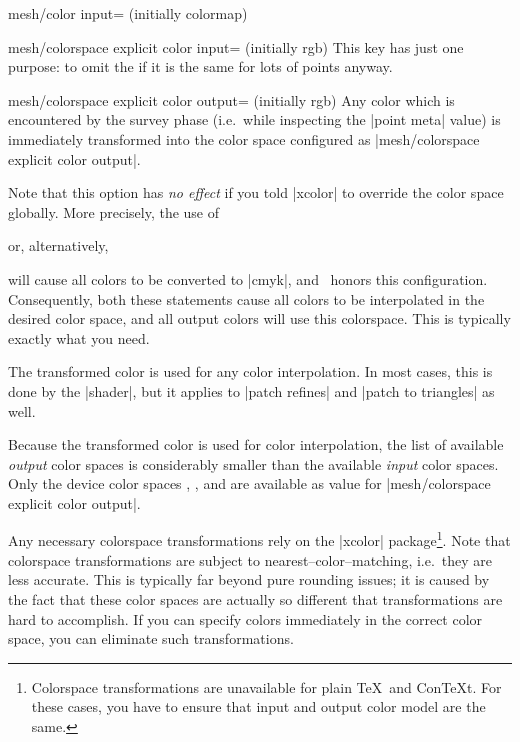 {{\begin{pgfplotskey}{mesh/color input= (initially colormap)}
\begin{pgfplotskey}{%
	mesh/colorspace explicit color input= (initially rgb)%
}
	This key has just one purpose: to omit the  if it is the same for lots of points anyway.
\end{pgfplotskey}

\begin{pgfplotskey}{%
	mesh/colorspace explicit color output= (initially rgb)%
}
	Any color which is encountered by the survey phase (i.e.\ while inspecting the |point meta| value) is immediately transformed into the color space configured as |mesh/colorspace explicit color output|.

	Note that this option has \emph{no effect} if you told |xcolor| to override the color space globally. More precisely, the use of 
\begin{codeexample}
\usepackage[cmyk]{xcolor}
\end{codeexample}
	or, alternatively,
\begin{codeexample}
\end{codeexample}
	will cause all colors to be converted to |cmyk|, and \PGFPlots\ honors this configuration. Consequently, both these statements cause all colors to be interpolated in the desired color space, and all output colors will use this colorspace. This is typically exactly what you need.

	The transformed color is used for any color interpolation. In most cases, this is done by the |shader|, but it applies to |patch refines| and |patch to triangles| as well.

	Because the transformed color is used for color interpolation, the list of available \emph{output} color spaces is considerably smaller than the available \emph{input} color spaces. Only the device color spaces , , and  are available as value for |mesh/colorspace explicit color output|.



	Any necessary colorspace transformations rely on the |xcolor| package\footnote{Colorspace transformations are unavailable for plain \TeX\ and Con\TeX t. For these cases, you have to ensure that input and output color model are the same.}. Note that colorspace transformations are subject to nearest--color--matching, i.e.\ they are less accurate. This is typically far beyond pure rounding issues; it is caused by the fact that these color spaces are actually so different that transformations are hard to accomplish. If you can specify colors immediately in the correct color space, you can eliminate such transformations.


\end{pgfplotskey}
\end{pgfplotskey}}}

